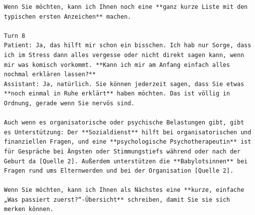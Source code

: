 \begin{Verbatim}[fontsize=\small,breaklines=true,breakanywhere=true]
Wenn Sie möchten, kann ich Ihnen noch eine **ganz kurze Liste mit den typischen ersten Anzeichen** machen.

Turn 8
Patient: Ja, das hilft mir schon ein bisschen. Ich hab nur Sorge, dass ich im Stress dann alles vergesse oder nicht direkt sagen kann, wenn mir was komisch vorkommt. **Kann ich mir am Anfang einfach alles nochmal erklären lassen?**
Assistant: Ja, natürlich. Sie können jederzeit sagen, dass Sie etwas **noch einmal in Ruhe erklärt** haben möchten. Das ist völlig in Ordnung, gerade wenn Sie nervös sind.

Auch wenn es organisatorische oder psychische Belastungen gibt, gibt es Unterstützung: Der **Sozialdienst** hilft bei organisatorischen und finanziellen Fragen, und eine **psychologische Psychotherapeutin** ist für Gespräche bei Ängsten oder Stimmungstiefs während oder nach der Geburt da [Quelle 2]. Außerdem unterstützen die **Babylotsinnen** bei Fragen rund ums Elternwerden und bei der Organisation [Quelle 2].

Wenn Sie möchten, kann ich Ihnen als Nächstes eine **kurze, einfache „Was passiert zuerst?“-Übersicht** schreiben, damit Sie sie sich merken können.
\end{Verbatim}
